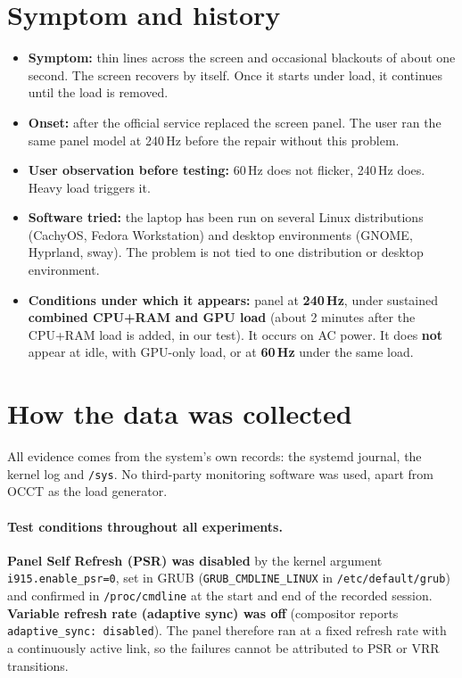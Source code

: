 \documentclass[11pt,a4paper]{article}
\newcommand{\reg}[1]{\texttt{#1}}
\begin{document}
\section{Symptom and history}
\begin{itemize}
\item \textbf{Symptom:} thin lines across the screen and occasional blackouts of about one second. The screen recovers by itself. Once
it starts under load, it continues until the load is removed.
\item \textbf{Onset:} after the official service replaced the screen panel. The user ran the same panel model at 240\,Hz before
the repair without this problem.
\item \textbf{User observation before testing:} 60\,Hz does not flicker, 240\,Hz does. Heavy load triggers it.
\item \textbf{Software tried:} the laptop has been run on several Linux distributions (CachyOS, Fedora Workstation) and desktop
environments (GNOME, Hyprland, sway). The problem is not tied to one distribution or desktop environment.
\item \textbf{Conditions under which it appears:} panel at \textbf{240\,Hz}, under sustained \textbf{combined CPU+RAM and GPU load}
(about 2 minutes after the CPU+RAM load is added, in our test). It occurs on AC power. It does \textbf{not} appear at idle, with GPU-only
load, or at \textbf{60\,Hz} under the same load.
\end{itemize}

\section{How the data was collected}
\label{sec:methods}
All evidence comes from the system's own records: the systemd journal, the kernel log and \reg{/sys}. No third-party
monitoring software was used, apart from OCCT as the load generator.

\paragraph{Test conditions throughout all experiments.} \textbf{Panel Self Refresh (PSR) was disabled} by the kernel argument
\reg{i915.enable\_psr=0}, set in GRUB (\reg{GRUB\_CMDLINE\_LINUX} in \reg{/etc/default/grub}) and confirmed in \reg{/proc/cmdline} at
the start and end of the recorded session. \textbf{Variable refresh rate (adaptive sync) was off} (compositor reports
\reg{adaptive\_sync: disabled}). The panel therefore ran at a fixed refresh rate with a continuously active link, so
the failures cannot be attributed to PSR or VRR transitions.
\end{document}

